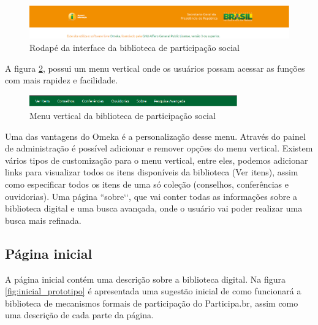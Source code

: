 \graphicspath{{figuras/prototipo/}}
\begin{figure}[H]
\centering
\includegraphics[width=1.0\textwidth]{rodape}
\caption{Rodapé da interface da biblioteca de participação social}
\label{fig:rodape_prototipo}
\end{figure}

A figura \ref{fig:vertical_prototipo}, possui um menu vertical onde os usuários possam acessar as funções com mais rapidez e facilidade.

\graphicspath{{figuras/prototipo/}}
\begin{figure}[H]
\centering
\includegraphics[width=0.8\textwidth]{barra-superior}
\caption{Menu vertical da biblioteca de participação social}
\label{fig:vertical_prototipo}
\end{figure}

Uma das vantagens do Omeka é a personalização desse menu. Através do painel de administração é possível adicionar e remover opções do menu vertical. Existem vários tipos de customização para o menu vertical, entre eles, podemos adicionar links para visualizar todos os itens disponíveis da biblioteca (Ver itens), assim como especificar todos os itens de uma só coleção (conselhos, conferências e ouvidorias). Uma página ``sobre‘‘, que vai conter todas as informações sobre a biblioteca digital e uma busca avançada, onde o usuário vai poder realizar uma busca mais refinada.

\subsection*{Página inicial}

A página inicial contém uma descrição sobre a biblioteca digital. Na figura \ref{fig:inicial_prototipo} é apresentada uma sugestão inicial de como funcionará a biblioteca de mecanismos formais de participação do Participa.br, assim como uma descrição de cada parte da página.

